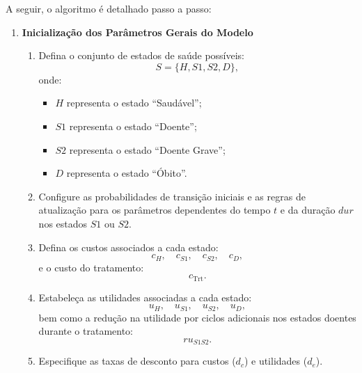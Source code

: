 \documentclass[12pt]{article}
\theoremstyle{break}
\begin{document}
A seguir, o algoritmo é detalhado passo a passo:

\begin{enumerate}
    \item \textbf{Inicialização dos Parâmetros Gerais do Modelo}
    \begin{enumerate}[label=\alph*)]
        \item Defina o conjunto de estados de saúde possíveis:
        \[
        S = \{H, S1, S2, D\},
        \]
        onde:
        \begin{itemize}
            \item $H$ representa o estado ``Saudável'';
            \item $S1$ representa o estado ``Doente'';
            \item $S2$ representa o estado ``Doente Grave'';
            \item $D$ representa o estado ``Óbito''.
        \end{itemize}
        \item Configure as probabilidades de transição iniciais e as regras de atualização para os parâmetros dependentes do tempo $t$ e da duração $dur$ nos estados $S1$ ou $S2$.
        \item Defina os custos associados a cada estado:
        \[
        c_H, \quad c_{S1}, \quad c_{S2}, \quad c_D,
        \]
        e o custo do tratamento:
        \[
        c_{\text{Trt}}.
        \]
        \item Estabeleça as utilidades associadas a cada estado:
        \[
        u_H, \quad u_{S1}, \quad u_{S2}, \quad u_D,
        \]
        bem como a redução na utilidade por ciclos adicionais nos estados doentes durante o tratamento:
        \[
        ru_{S1S2}.
        \]
        \item Especifique as taxas de desconto para custos ($d_c$) e utilidades ($d_e$).
    \end{enumerate}
    

\end{enumerate}
\end{document}
